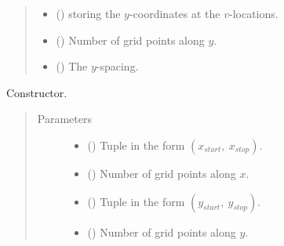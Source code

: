 \documentclass[letterpaper,10pt,english]{sphinxmanual}
\begin{document}
\begin{fulllineitems}
\begin{quote}
\begin{description}
\begin{itemize}
\item {} 
{\hyperref[\detokenize{api:tasmania.grids.grid_xyz.GridXYZ.y_at_v_locations}]{}} () \textendash{} {\hyperref[\detokenize{api:tasmania.grids.axis.Axis}]{}} storing the \(y\)-coordinates at the \(v\)-locations.

\item {} 
{\hyperref[\detokenize{api:tasmania.grids.grid_xyz.GridXYZ.ny}]{}} () \textendash{} Number of grid points along \(y\).

\item {} 
{\hyperref[\detokenize{api:tasmania.grids.grid_xyz.GridXYZ.dy}]{}} () \textendash{} The \(y\)-spacing.

\end{itemize}

\end{description}\end{quote}

\begin{fulllineitems}
\label{\detokenize{api:tasmania.grids.grid_xy.GridXY.__init__}}
Constructor.
\begin{quote}\begin{description}
\item[{Parameters}] \leavevmode\begin{itemize}
\item {} 
 () \textendash{} Tuple in the form \((x_{start}, ~ x_{stop})\).

\item {} 
 () \textendash{} Number of grid points along \(x\).

\item {} 
 () \textendash{} Tuple in the form \((y_{start}, ~ y_{stop})\).

\item {} 
 () \textendash{} Number of grid points along \(y\).


\end{itemize}
\end{description}
\end{quote}
\end{fulllineitems}
\end{fulllineitems}
\end{document}
